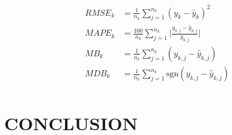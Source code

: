 \begin{equation}
\label{eq:fmetrics}
\begin{split}
	RMSE_k&=\frac{1}{n_k} \sum\limits_{j=1}^{n_k} (y_k-\hat{y}_k)^2 \\
	MAPE_k&=\frac{100}{n_k} \sum\limits_{j=1}^{n_k} \bigg|\frac{y_{k,j}-\hat{y}_{k,j}}{y_{k,j}}\bigg| \\
	MB_k&=\frac{1}{n_k} \sum\limits_{j=1}^{n_k} (y_{k,j}-\hat{y}_{k,j}) \\
	MDB_k&=\frac{1}{n_k} \sum\limits_{j=1}^{n_k} \textrm{sgn}(y_{k,j}-\hat{y}_{k,j})\\
\end{split}
\end{equation}






\section{CONCLUSION}
